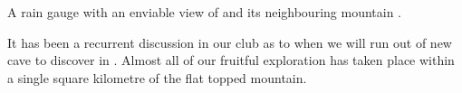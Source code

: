 \begin{marginfigure}
\checkoddpage \ifoddpage \forcerectofloat \else \forceversofloat \fi
\centering
 \caption{A rain gauge with an enviable view of  and its neighbouring mountain . }
 \label{rain gauge}
\end{marginfigure}

It has been a recurrent discussion in our club as to when we will run
out of new cave to discover in . Almost all of our fruitful
exploration has taken place within a single square kilometre of the flat
topped mountain.

